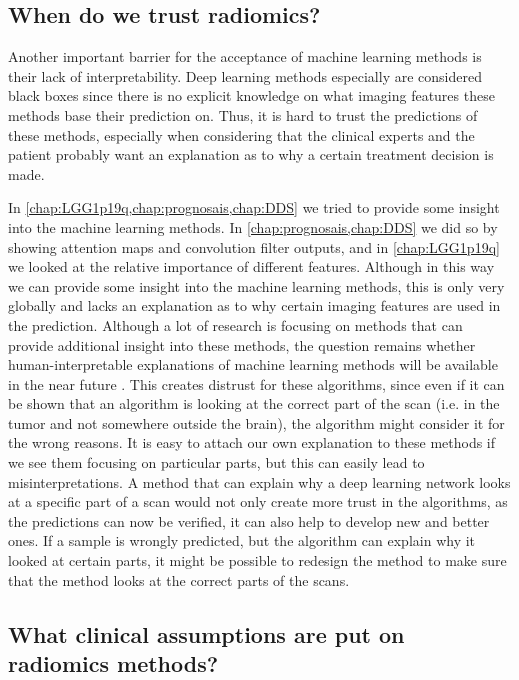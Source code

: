 \subsection{When do we trust radiomics?}

Another important barrier for the acceptance of machine learning methods is their lack of interpretability.
Deep learning methods especially are considered black boxes since there is no explicit knowledge on what imaging features these methods base their prediction on.
Thus, it is hard to trust the predictions of these methods, especially when considering that the clinical experts and the patient probably want an explanation as to why a certain treatment decision is made.

In \cref{chap:LGG1p19q,chap:prognosais,chap:DDS} we  tried to provide some insight into the machine learning methods.
In \cref{chap:prognosais,chap:DDS} we did so by showing attention maps and convolution filter outputs, and in \cref{chap:LGG1p19q} we looked at the relative importance of different features.
Although in this way we can provide some insight into the machine learning methods, this is only very globally and lacks an explanation as to why certain imaging features are used in the prediction.
Although a lot of research is focusing on methods that can provide additional insight into these methods, the question remains whether human-interpretable explanations of machine learning methods will be available in the near future \autocite{zhang2018interpretable}.
This creates distrust for these algorithms, since even if it can be shown that an algorithm is looking at the correct part of the scan (i.e. in the tumor and not somewhere outside the brain), the algorithm might consider it for the wrong reasons.
It is easy to attach our own explanation to these methods if we see them focusing on particular parts, but this can easily lead to misinterpretations.
A method that can explain why a deep learning network looks at a specific part of a scan would not only create more trust in the algorithms, as the predictions can now be verified, it can also help to develop new and better ones.
If a sample is wrongly predicted, but the algorithm can explain why it looked at certain parts, it might be possible to redesign the method to make sure that the method looks at the correct parts of the scans.

\subsection{What clinical assumptions are put on radiomics methods?}

